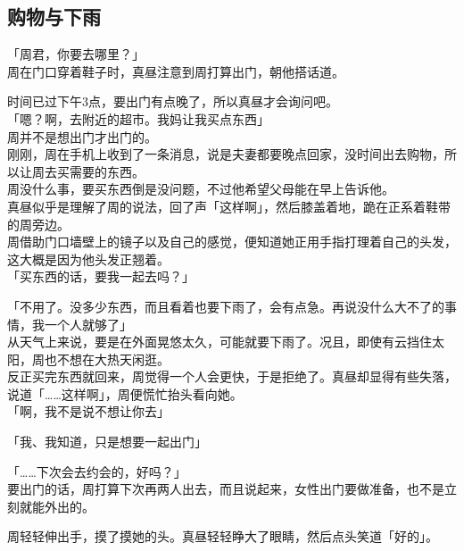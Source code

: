 \subsection{购物与下雨}

「周君，你要去哪里？」\\

周在门口穿着鞋子时，真昼注意到周打算出门，朝他搭话道。

时间已过下午3点，要出门有点晚了，所以真昼才会询问吧。\\

「嗯？啊，去附近的超市。我妈让我买点东西」\\

周并不是想出门才出门的。\\

刚刚，周在手机上收到了一条消息，说是夫妻都要晚点回家，没时间出去购物，所以让周去买需要的东西。\\

周没什么事，要买东西倒是没问题，不过他希望父母能在早上告诉他。\\

真昼似乎是理解了周的说法，回了声「这样啊」，然后膝盖着地，跪在正系着鞋带的周旁边。\\

周借助门口墙壁上的镜子以及自己的感觉，便知道她正用手指打理着自己的头发，这大概是因为他头发正翘着。\\

「买东西的话，要我一起去吗？」

「不用了。没多少东西，而且看着也要下雨了，会有点急。再说没什么大不了的事情，我一个人就够了」\\

从天气上来说，要是在外面晃悠太久，可能就要下雨了。况且，即使有云挡住太阳，周也不想在大热天闲逛。\\

反正买完东西就回来，周觉得一个人会更快，于是拒绝了。真昼却显得有些失落，说道「……这样啊」，周便慌忙抬头看向她。\\

「啊，我不是说不想让你去」

「我、我知道，只是想要一起出门」

「……下次会去约会的，好吗？」\\

要出门的话，周打算下次再两人出去，而且说起来，女性出门要做准备，也不是立刻就能外出的。

周轻轻伸出手，摸了摸她的头。真昼轻轻睁大了眼睛，然后点头笑道「好的」。\\

